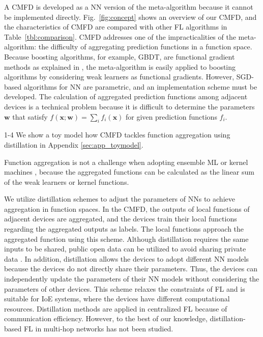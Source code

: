 \documentclass[journal]{IEEEtran}
\begin{document}
A \gls{CMFD} is developed as a \gls{NN} version of the meta-algorithm because it cannot be implemented directly.
Fig.~\ref{fig:concept} shows an overview of our \gls{CMFD},
and the characteristics of \gls{CMFD} are compared with other \gls{FL} algorithms in Table~\ref{tbl:comparison}.
\gls{CMFD} addresses one of the impracticalities of the meta-algorithm: the difficulty of aggregating prediction functions in a function space.
Because boosting algorithms, for example, \gls{GBDT}, are functional gradient methods as explained in \cite{mason1999boosting},
the meta-algorithm is easily applied to boosting algorithms by considering weak learners as functional gradients.
However, \gls{SGD}-based algorithms for \gls{NN} are parametric, and an implementation scheme must be developed.
The calculation of aggregated prediction functions among adjacent devices is a technical problem
because it is difficult to determine the parameters $\bm{w}$ that satisfy $f(\bm{x};\bm{w}) = \sum_i f_i(\bm{x})$ for given prediction functions $f_i$.
\begin{revhl}{1-4}
We show a toy model how \gls{CMFD} tackles function aggregation using distillation in Appendix \ref{sec:app_toymodel}.
\end{revhl}

Function aggregation is not a challenge when adopting ensemble \gls{ML} or kernel machines \cite{koppel2018decentralized},
because the aggregated functions can be calculated as the linear sum of the weak learners or kernel functions.

We utilize distillation schemes \cite{bucilua2006model} to adjust the parameters of \gls{NN}s to achieve aggregation in function spaces.
In the \gls{CMFD}, the outputs of local functions of adjacent devices are aggregated,
and the devices train their local functions regarding the aggregated outputs as labels.
The local functions approach the aggregated function using this scheme.
Although distillation requires the same inputs to be shared, public open data can be utilized to avoid sharing private data \cite{itahara2021distillation}.
In addition, distillation allows the devices to adopt different \gls{NN} models
because the devices do not directly share their parameters.
Thus, the devices can independently update the parameters of their \gls{NN} models without considering the parameters of other devices.
This scheme relaxes the constraints of \gls{FL}
and is suitable for \gls{IoE} systems, where the devices have different computational resources.
Distillation methods are applied in centralized \gls{FL} \cite{park2019wireless,park2019distilling,oh2020mix2fld,ahn2019wireless,itahara2021distillation,chang2019cronus,jeong2018communication}
because of communication efficiency.
However, to the best of our knowledge, distillation-based \gls{FL} in multi-hop networks has not been studied.
\end{document}
